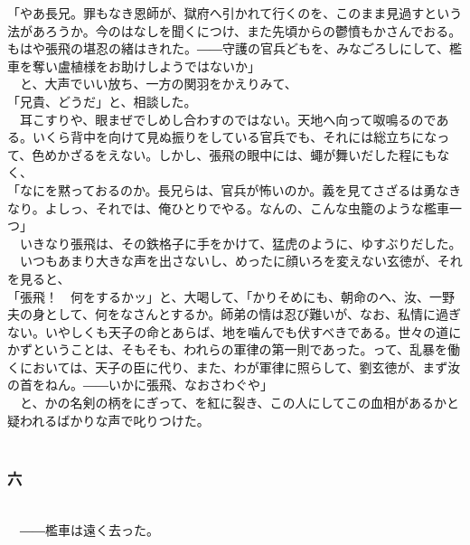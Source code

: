 \documentclass[
  paper=a5,
  fontsize=10pt,
  jafontsize=9.5pt,
  tate,                  %
  open_bracket_pos=nibu, %
]{jlreq}
\begin{document}
「やあ長兄。罪もなき恩師が、獄府へ引かれて行くのを、このまま見過すという法があろうか。今のはなしを聞くにつけ、また先頃からの鬱憤もかさんでおる。もはや張飛の堪忍の緒はきれた。――守護の官兵どもを、みなごろしにして、檻車を奪い盧植様をお助けしようではないか」\\


　と、大声でいい放ち、一方の関羽をかえりみて、\\


「兄貴、どうだ」と、相談した。\\


　耳こすりや、眼まぜでしめし合わすのではない。天地へ向って呶鳴るのである。いくら背中を向けて見ぬ振りをしている官兵でも、それには総立ちになって、色めかざるをえない。しかし、張飛の眼中には、蠅が舞いだした程にもなく、\\


「なにを黙っておるのか。長兄らは、官兵が怖いのか。義を見てさざるは勇なきなり。よしっ、それでは、俺ひとりでやる。なんの、こんな虫籠のような檻車一つ」\\


　いきなり張飛は、その鉄格子に手をかけて、猛虎のように、ゆすぶりだした。\\


　いつもあまり大きな声を出さないし、めったに顔いろを変えない玄徳が、それを見ると、\\


「張飛！　何をするかッ」と、大喝して、「かりそめにも、朝命のへ、汝、一野夫の身として、何をなさんとするか。師弟の情は忍び難いが、なお、私情に過ぎない。いやしくも天子の命とあらば、地を噛んでも伏すべきである。世々の道にかずということは、そもそも、われらの軍律の第一則であった。って、乱暴を働くにおいては、天子の臣に代り、また、わが軍律に照らして、劉玄徳が、まず汝の首をねん。――いかに張飛、なおさわぐや」\\


　と、かの名剣の柄をにぎって、を紅に裂き、この人にしてこの血相があるかと疑われるばかりな声で叱りつけた。\\

\\

\subsubsection{六}

\\


　――檻車は遠く去った。\\
\end{document}
